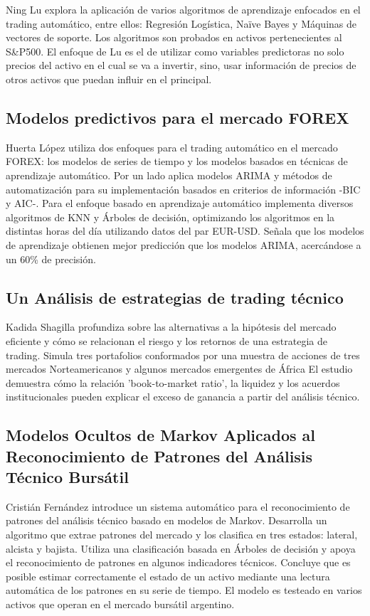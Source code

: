 \documentclass[a4paper,12pt]{Latex/Classes/PhDthesisPSnPDF}
\begin{document}
Ning Lu explora la aplicación de varios algoritmos de aprendizaje enfocados en el trading automático, entre ellos: Regresión Logística, Naïve Bayes y Máquinas de vectores de soporte. Los algoritmos son probados en activos pertenecientes al S\&P500. El enfoque de Lu es el de utilizar como variables predictoras no solo precios del activo en el cual se va a invertir, sino, usar información de precios de otros activos que puedan influir en el principal.

\subsection{Modelos predictivos para el mercado FOREX}

Huerta López utiliza dos enfoques para el trading automático en el mercado FOREX: los modelos de series de tiempo y los modelos basados en técnicas de aprendizaje automático. Por un lado aplica modelos ARIMA y métodos de automatización para su implementación basados en criterios de información -BIC y AIC-. Para el enfoque basado en aprendizaje automático implementa diversos algoritmos de KNN y Árboles de decisión, optimizando los algoritmos en la distintas horas del día utilizando datos del par EUR-USD. Señala que los modelos de aprendizaje obtienen mejor predicción que los modelos ARIMA, acercándose a un 60\% de precisión.

\subsection{Un Análisis de estrategias de trading técnico}

Kadida Shagilla profundiza sobre las alternativas a la hipótesis del mercado eficiente y cómo se relacionan el riesgo y los retornos de una estrategia de trading. Simula tres portafolios conformados por una muestra de acciones de tres mercados Norteamericanos y algunos mercados emergentes de África El estudio demuestra cómo la relación 'book-to-market ratio', la liquidez y los acuerdos institucionales pueden explicar el exceso de ganancia a partir del análisis técnico. 

\subsection{Modelos Ocultos de Markov Aplicados al Reconocimiento de Patrones del Análisis Técnico Bursátil}

Cristián Fernández introduce un sistema automático para el reconocimiento de patrones del análisis técnico basado en modelos de Markov. Desarrolla un algoritmo que extrae patrones del mercado y los clasifica en tres estados: lateral, alcista y bajista. Utiliza una clasificación basada en Árboles de decisión y apoya el reconocimiento de patrones en algunos indicadores técnicos. Concluye que es posible estimar correctamente el estado de un activo mediante una lectura automática de los patrones en su serie de tiempo. El modelo es testeado en varios activos que operan en el mercado bursátil argentino.
\end{document}
